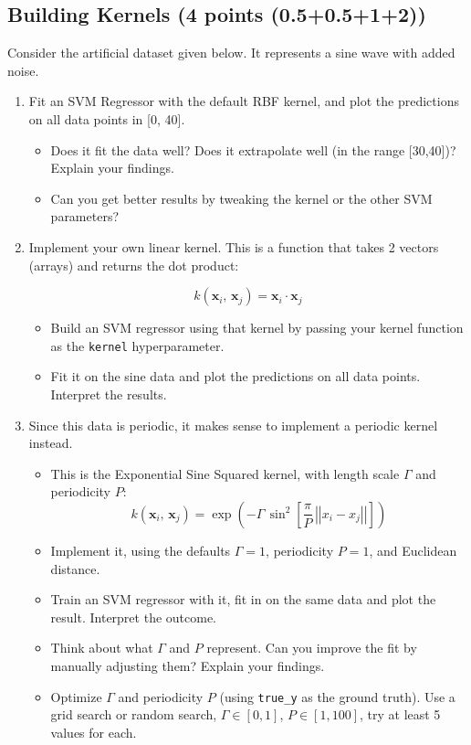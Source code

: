 \documentclass[11pt]{article}
\providecommand{\tightlist}{%
      \setlength{\itemsep}{0pt}\setlength{\parskip}{0pt}}
\begin{document}
    \subsection{Building Kernels (4 points
(0.5+0.5+1+2))}\label{building-kernels-4-points-0.50.512}

Consider the artificial dataset given below. It represents a sine wave
with added noise.

    \begin{enumerate}
\def\labelenumi{\arabic{enumi}.}
\item
  Fit an SVM Regressor with the default RBF kernel, and plot the
  predictions on all data points in {[}0, 40{]}.

  \begin{itemize}
  \tightlist
  \item
    Does it fit the data well? Does it extrapolate well (in the range
    {[}30,40{]})? Explain your findings.
  \item
    Can you get better results by tweaking the kernel or the other SVM
    parameters?
  \end{itemize}
\item
  Implement your own linear kernel. This is a function that takes 2
  vectors (arrays) and returns the dot product:

  \[k(\mathbf{x}_i,\,\mathbf{x}_j) = \mathbf{x}_i \cdot \mathbf{x}_j\]

  \begin{itemize}
  \tightlist
  \item
    Build an SVM regressor using that kernel by passing your kernel
    function as the \texttt{kernel} hyperparameter.
  \item
    Fit it on the sine data and plot the predictions on all data points.
    Interpret the results.
  \end{itemize}
\item
  Since this data is periodic, it makes sense to implement a periodic
  kernel instead.

  \begin{itemize}
  \tightlist
  \item
    This is the Exponential Sine Squared kernel, with length scale
    \(\Gamma\) and periodicity \(P\):
    \[k(\mathbf{x}_i,\,\mathbf{x}_j) = \exp \left( -\Gamma\,\sin^2\left[\frac{\pi}{P}\,\left|\left|x_i-x_j\right|\right|\right]\right)\]
  \item
    Implement it, using the defaults \(\Gamma=1\), periodicity \(P=1\),
    and Euclidean distance.
  \item
    Train an SVM regressor with it, fit in on the same data and plot the
    result. Interpret the outcome.
  \item
    Think about what \(\Gamma\) and \(P\) represent. Can you improve the
    fit by manually adjusting them? Explain your findings.
  \item
    Optimize \(\Gamma\) and periodicity \(P\) (using \texttt{true\_y} as
    the ground truth). Use a grid search or random search,
    \(\Gamma \in [0,1]\), \(P \in [1,100]\), try at least 5 values for
    each.
  \end{itemize}
\end{enumerate}
\end{document}

